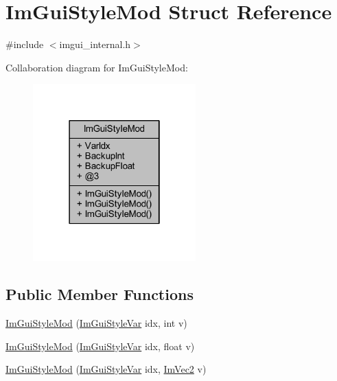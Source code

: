 \hypertarget{struct_im_gui_style_mod}{}\section{Im\+Gui\+Style\+Mod Struct Reference}
\label{struct_im_gui_style_mod}


{\ttfamily \#include $<$imgui\+\_\+internal.\+h$>$}



Collaboration diagram for Im\+Gui\+Style\+Mod\+:
\nopagebreak
\begin{figure}[H]
\begin{center}
\leavevmode
\includegraphics[width=178pt]{struct_im_gui_style_mod__coll__graph}
\end{center}
\end{figure}
\subsection*{Public Member Functions}
\begin{DoxyCompactItemize}
\item 
\mbox{\hyperlink{struct_im_gui_style_mod_ae9987273b247f021020034256364bec8}{Im\+Gui\+Style\+Mod}} (\mbox{\hyperlink{imgui_8h_ac919acabce24faae590e295b424874ca}{Im\+Gui\+Style\+Var}} idx, int v)
\item 
\mbox{\hyperlink{struct_im_gui_style_mod_a737c3fad802a8d5d4616f9decc7e402d}{Im\+Gui\+Style\+Mod}} (\mbox{\hyperlink{imgui_8h_ac919acabce24faae590e295b424874ca}{Im\+Gui\+Style\+Var}} idx, float v)
\item 
\mbox{\hyperlink{struct_im_gui_style_mod_a28647cc4ab8b95b8ee30e0fc7401ae07}{Im\+Gui\+Style\+Mod}} (\mbox{\hyperlink{imgui_8h_ac919acabce24faae590e295b424874ca}{Im\+Gui\+Style\+Var}} idx, \mbox{\hyperlink{struct_im_vec2}{Im\+Vec2}} v)
\end{DoxyCompactItemize}
